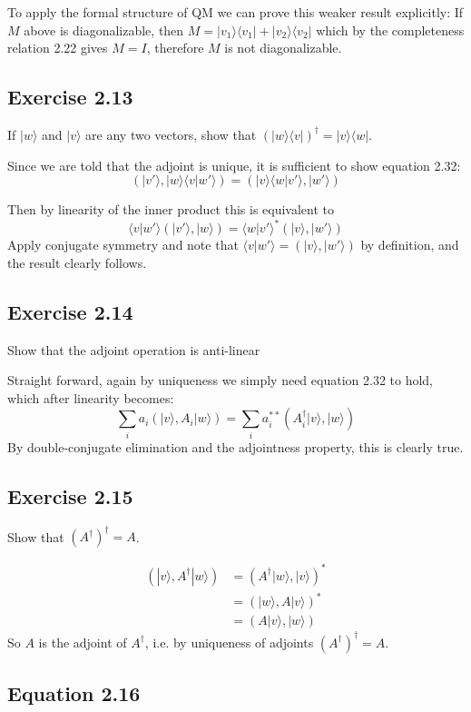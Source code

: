 \documentclass[]{article}
\newcommand{\bra}[1]{\langle #1 |}
\newcommand{\ket}[1]{| #1 \rangle}
\newcommand{\braket}[2]{\langle #1 | #2 \rangle}
\begin{document}
To apply the formal structure of QM we can prove this weaker result explicitly:
If $M$ above is diagonalizable, then $M = \ket{v_1}\bra{v_1} + \ket{v_2}\bra{v_2}$ which by the completeness relation 2.22 gives $M = I$, therefore $M$ is not diagonalizable.

\subsection{Exercise 2.13}

If $\ket{w}$ and $\ket{v}$ are any two vectors, show that
$(\ket{w}\bra{v})^\dagger = \ket{v}\bra{w}$.

Since we are told that the adjoint is unique, it is sufficient to show equation 2.32:
\[(\ket{v'}, \ket{w}\braket{v}{w'}) =
(\ket{v}\braket{w}{v'}, \ket{w'})\]

Then by linearity of the inner product this is equivalent to
\[\braket{v}{w'}(\ket{v'}, \ket{w}) =
\braket{w}{v'}^*(\ket{v}, \ket{w'})\]
Apply conjugate symmetry and note that $\braket{v}{w'} = (\ket{v},
\ket{w'})$ by definition, and the result clearly follows.

\subsection{Exercise 2.14}

Show that the adjoint operation is anti-linear

Straight forward, again by uniqueness we simply need equation 2.32 to hold, which after linearity becomes:
\[\sum_i a_i(\ket{v}, A_i\ket{w}) = \sum_i
a_i^{**}(A_i^\dagger\ket{v}, \ket{w})\]
By double-conjugate elimination and the adjointness property, this is clearly true.

\subsection{Exercise 2.15}

Show that $(A^\dagger)^\dagger = A$.

\begin{align*}
	(\ket{v}, A^\dagger\ket{w})
	&= (A^\dagger\ket{w}, \ket{v})^* \\
	&= (\ket{w}, A\ket{v})^* \\
	&= (A\ket{v}, \ket{w})
\end{align*}
So $A$ is the adjoint of $A^\dagger$, i.e. by uniqueness of adjoints $(A^\dagger)^\dagger = A$.

\subsection{Equation 2.16}
\end{document}
